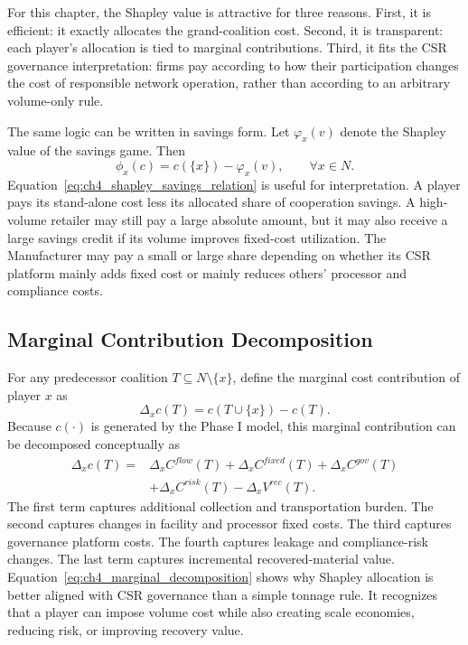 For this chapter, the Shapley value is attractive for three reasons. First, it is efficient: it exactly allocates the grand-coalition cost. Second, it is transparent: each player's allocation is tied to marginal contributions. Third, it fits the CSR governance interpretation: firms pay according to how their participation changes the cost of responsible network operation, rather than according to an arbitrary volume-only rule.

The same logic can be written in savings form. Let $\varphi_x(v)$ denote the Shapley value of the savings game. Then
\begin{equation}
\label{eq:ch4_shapley_savings_relation}
\phi_x(c)=c(\{x\})-\varphi_x(v),
\qquad \forall x\in N.
\end{equation}
Equation~\eqref{eq:ch4_shapley_savings_relation} is useful for interpretation. A player pays its stand-alone cost less its allocated share of cooperation savings. A high-volume retailer may still pay a large absolute amount, but it may also receive a large savings credit if its volume improves fixed-cost utilization. The Manufacturer may pay a small or large share depending on whether its CSR platform mainly adds fixed cost or mainly reduces others' processor and compliance costs.

\subsection{Marginal Contribution Decomposition}

For any predecessor coalition $T\subseteq N\setminus\{x\}$, define the marginal cost contribution of player $x$ as
\begin{equation}
\label{eq:ch4_marginal_cost}
\Delta_x c(T)=c(T\cup\{x\})-c(T).
\end{equation}
Because $c(\cdot)$ is generated by the Phase I model, this marginal contribution can be decomposed conceptually as
\begin{equation}
\label{eq:ch4_marginal_decomposition}
\begin{aligned}
\Delta_x c(T)=&
\Delta_x C^{flow}(T)
+\Delta_x C^{fixed}(T)
+\Delta_x C^{gov}(T)\\
&+\Delta_x C^{risk}(T)
-\Delta_x V^{rec}(T).
\end{aligned}
\end{equation}
The first term captures additional collection and transportation burden. The second captures changes in facility and processor fixed costs. The third captures governance platform costs. The fourth captures leakage and compliance-risk changes. The last term captures incremental recovered-material value. Equation~\eqref{eq:ch4_marginal_decomposition} shows why Shapley allocation is better aligned with CSR governance than a simple tonnage rule. It recognizes that a player can impose volume cost while also creating scale economies, reducing risk, or improving recovery value.

